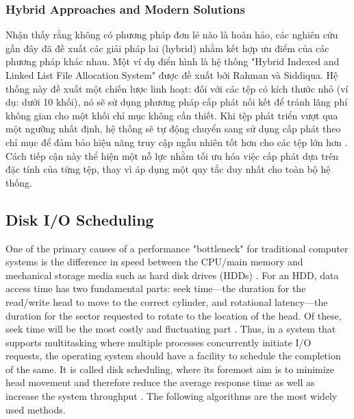 \documentclass[12pt]{article}
\begin{document}
\subsubsection{Hybrid Approaches and Modern Solutions}
Nhận thấy rằng không có phương pháp đơn lẻ nào là hoàn hảo, các nghiên cứu gần đây đã đề xuất các giải pháp lai (hybrid) nhằm kết hợp ưu điểm của các phương pháp khác nhau. Một ví dụ điển hình là hệ thống "Hybrid Indexed and Linked List File Allocation System" được đề xuất bởi Rahman và Siddiqua. Hệ thống này đề xuất một chiến lược linh hoạt: đối với các tệp có kích thước nhỏ (ví dụ: dưới 10 khối), nó sẽ sử dụng phương pháp cấp phát nối kết để tránh lãng phí không gian cho một khối chỉ mục không cần thiết. Khi tệp phát triển vượt qua một ngưỡng nhất định, hệ thống sẽ tự động chuyển sang sử dụng cấp phát theo chỉ mục để đảm bảo hiệu năng truy cập ngẫu nhiên tốt hơn cho các tệp lớn hơn \parencite{IRJMETS2021}. Cách tiếp cận này thể hiện một nỗ lực nhằm tối ưu hóa việc cấp phát dựa trên đặc tính của từng tệp, thay vì áp dụng một quy tắc duy nhất cho toàn bộ hệ thống.


\subsection{Disk I/O Scheduling}

One of the primary causes of a performance "bottleneck" for traditional computer systems is the difference in speed between the CPU/main memory and mechanical storage media such as hard disk drives (HDDs) \parencite{Pokharel2021}. For an HDD, data access time has two fundamental parts: seek time—the duration for the read/write head to move to the correct cylinder, and rotational latency—the duration for the sector requested to rotate to the location of the head. Of these, seek time will be the most costly and fluctuating part \parencite{KansalDiskScheduling}. Thus, in a system that supports multitasking where multiple processes concurrently initiate I/O requests, the operating system should have a facility to schedule the completion of the same. It is called disk scheduling, where its foremost aim is to minimize head movement and therefore reduce the average response time as well as increase the system throughput \parencite{GeeksForGeeks2025IO}. The following algorithms are the most widely used methods.
\end{document}
